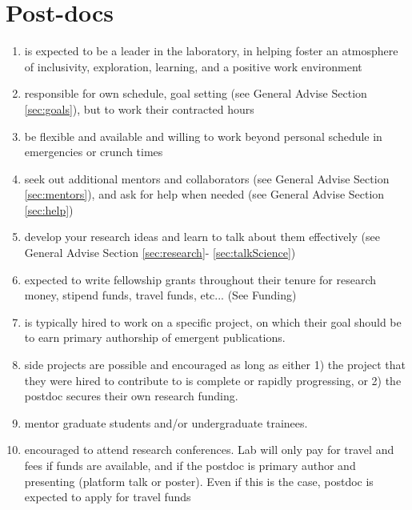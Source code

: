 \documentclass[12pt]{article}
\begin{document}
\section{Post-docs}
\begin{enumerate}
\item is expected to be a leader in the laboratory, in helping foster
  an atmosphere of inclusivity, exploration, learning, and a positive
  work environment
\item  responsible for own schedule, goal setting (see General
  Advise Section \ref{sec:goals}), but to work their contracted hours
\item be flexible and available and willing to work beyond personal
  schedule in emergencies or crunch times
\item seek out additional mentors and collaborators (see General
  Advise Section \ref{sec:mentors}), and ask for help when needed (see
  General Advise Section \ref{sec:help})
\item develop your research ideas and learn to talk about them
  effectively (see General Advise Section \ref{sec:research}-
  \ref{sec:talkScience})
\item expected to write fellowship grants throughout their tenure
  for research money, stipend funds, travel funds, etc... (See Funding)
\item is typically hired to work on a specific project, on which
  their goal should be to earn primary authorship of emergent
  publications.
\item side projects are possible and encouraged as long as either 1)
  the project that they were hired to contribute to is complete or
  rapidly progressing, or 2) the postdoc secures their own research
  funding.
\item mentor graduate students and/or undergraduate trainees.
\item encouraged to attend research conferences. Lab will only pay
  for travel and fees if funds are available, and if the postdoc is
  primary author and presenting (platform talk or poster). Even if
  this is the case, postdoc is expected to apply for travel funds
\end{enumerate}
\end{document}
